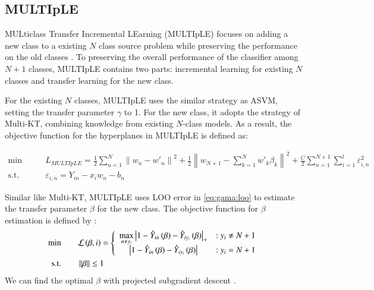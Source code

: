 \subsection{MULTIpLE}
MULticlass Transfer Incremental LEarning (MULTIpLE) focuses on adding a new class to a existing $N$ class source problem while preserving the performance on the old classes \cite{kuzborskij2013n}. To preserving the overall performance of the classifier among $N+1$ classes, MULTIpLE contains two parts: incremental learning for existing $N$ classes and transfer learning for the new class.

For the existing $N$ classes, MULTIpLE uses the similar strategy as ASVM, setting the transfer parameter $\gamma$ to 1. For the new class, it adopts the strategy of Multi-KT, combining knowledge from existing $N$-class models. As a result, the objective function for the hyperplanes in MULTIpLE is defined as:

\begin{equation}
\begin{aligned}
\text{min}\qquad {} & L_{MULTIpLE}=\frac{1}{2}\sum\limits_{n = 1}^N {{{\left\| {{w_n} - {{w'}_n}} \right\|}^2}}  + \frac{1}{2}{\left\| {{w_{N + 1}} - \sum\limits_{k = 1}^N {w{'_k}{\beta _k}} } \right\|^2}+ \frac{C}{2}\sum\limits_{n = 1}^{N + 1} {\sum\limits_{i = 1}^l {\varepsilon _{i,n}^2} }  \\
\text{s.t.}\qquad {} &{\varepsilon _{i,n}} = {Y_{in}} -  {x_i}{w_n} - {b_n}
\end{aligned}\label{eq:gama:multiple}
\end{equation}

Similar like Multi-KT, MULTIpLE uses LOO error in \eqref{eq:gama:loo} to estimate the transfer parameter $\beta$ for the new class. The objective function for $\beta$ estimation is defined by \cite{crammer2002algorithmic}:
\begin{equation}\label{eq:gama:multib}
\begin{aligned}
\text{min} \qquad& {\cal L}\left( {\beta ,i} \right) = \left\{ {\begin{array}{*{20}{c}}
{\mathop {\max }\limits_{n \ne {y_i}} {{\left| {1 - {{\hat Y}_{in}}\left( \beta  \right) - {{\hat Y}_{i{y_i}}}\left( \beta  \right)} \right|}_ + }}&{{:y_i} \ne N + 1}\\
{\left| {1 - {{\hat Y}_{in}}\left( \beta  \right) - {{\hat Y}_{i{y_i}}}\left( \beta  \right)} \right|}&{{:y_i} = N + 1}
\end{array}} \right.  \\
\text{s.t.} \qquad& \left\| \beta  \right\| \le 1
\end{aligned}
\end{equation}
We can find the optimal $\beta$ with projected subgradient descent \cite{BoydCO}. 